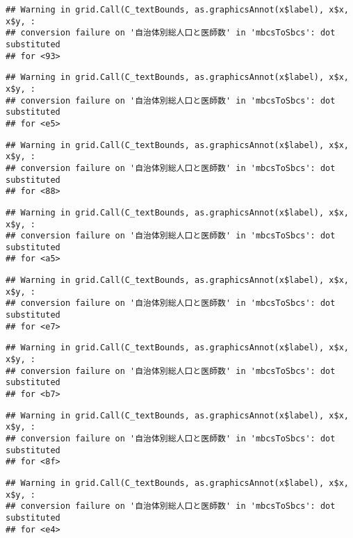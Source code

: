 \documentclass[
]{article}
\begin{document}
\begin{verbatim}
## Warning in grid.Call(C_textBounds, as.graphicsAnnot(x$label), x$x, x$y, :
## conversion failure on '自治体別総人口と医師数' in 'mbcsToSbcs': dot substituted
## for <93>
\end{verbatim}

\begin{verbatim}
## Warning in grid.Call(C_textBounds, as.graphicsAnnot(x$label), x$x, x$y, :
## conversion failure on '自治体別総人口と医師数' in 'mbcsToSbcs': dot substituted
## for <e5>
\end{verbatim}

\begin{verbatim}
## Warning in grid.Call(C_textBounds, as.graphicsAnnot(x$label), x$x, x$y, :
## conversion failure on '自治体別総人口と医師数' in 'mbcsToSbcs': dot substituted
## for <88>
\end{verbatim}

\begin{verbatim}
## Warning in grid.Call(C_textBounds, as.graphicsAnnot(x$label), x$x, x$y, :
## conversion failure on '自治体別総人口と医師数' in 'mbcsToSbcs': dot substituted
## for <a5>
\end{verbatim}

\begin{verbatim}
## Warning in grid.Call(C_textBounds, as.graphicsAnnot(x$label), x$x, x$y, :
## conversion failure on '自治体別総人口と医師数' in 'mbcsToSbcs': dot substituted
## for <e7>
\end{verbatim}

\begin{verbatim}
## Warning in grid.Call(C_textBounds, as.graphicsAnnot(x$label), x$x, x$y, :
## conversion failure on '自治体別総人口と医師数' in 'mbcsToSbcs': dot substituted
## for <b7>
\end{verbatim}

\begin{verbatim}
## Warning in grid.Call(C_textBounds, as.graphicsAnnot(x$label), x$x, x$y, :
## conversion failure on '自治体別総人口と医師数' in 'mbcsToSbcs': dot substituted
## for <8f>
\end{verbatim}

\begin{verbatim}
## Warning in grid.Call(C_textBounds, as.graphicsAnnot(x$label), x$x, x$y, :
## conversion failure on '自治体別総人口と医師数' in 'mbcsToSbcs': dot substituted
## for <e4>
\end{verbatim}
\end{document}
